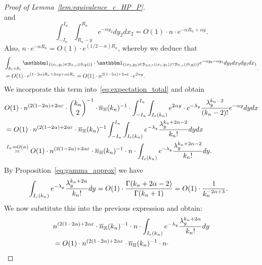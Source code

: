 \begin{proof}[Proof of Lemma~\ref{lem:equivalence_c_HP_P}]
$$$$
and 
$$\int_{-I_n}^{I_n} \int_{R_n - y}^{R_n}  e^{-\alpha y_2} dy_2 dx_2 
=O(1) \cdot n \cdot e^{-\alpha R_n +\alpha y}.
$$
Also, $n \cdot e^{-\alpha R_n} = O(1) \cdot e^{(1/2 -\alpha) R_n}$, whereby we deduce that 
\begin{equation*}
\begin{split}
&\int_{\mathcal{S}_1 \times \mathcal{S}_1} \ind{(x_1,y_1) \in \BallHyp{(0,y)}} \cdot
\ind{(x_2,y_2) \in \BallSym{(x_1,y_1)} \cap \BallHyp{(0,y)}} 
 e^{-\alpha y_2 - \alpha y_1} dy_2 dx_2 dy_1 dx_1 \\
&=O(1) \cdot e^{(1-2\alpha)R_n + 2\alpha y + \alpha \eps R_n} =O(1) \cdot n^{2(1-2\alpha) + 2\alpha \eps} \cdot e^{2\alpha y}.
\end{split}.
\end{equation*}
We incorporate this term into~\eqref{eq:expectation_total} and obtain
\begin{equation*} 
\begin{split}
& O(1) \cdot n^{(2(1-2\alpha) + 2\alpha \varepsilon} \cdot {k_n \choose 2}^{-1} \cdot \overline{n}_{\mathbb{H}}(k_n)^{-1} \cdot 
\int_{-I_n}^{I_n} \int_{I_\varepsilon (k_n)} 
e^{2\alpha y} \cdot e^{-\lambda_y} 
\frac{\lambda_y^{k_n-2}}{(k_n-2)!} e^{-\alpha y} dy dx \\ 
&=O(1) \cdot n^{(2(1-2\alpha) + 2\alpha \varepsilon} \cdot \overline{n}_{\mathbb{H}}(k_n)^{-1}
\int_{-I_n}^{I_n} \int_{I_\varepsilon (k_n)} 
e^{-\lambda_y} 
\frac{\lambda_y^{k_n + 2\alpha - 2}}{k_n!}  dy dx \\ 
&\stackrel{I_n = O(n)}{=}  O(1) \cdot n^{(2(1-2\alpha) + 2\alpha \varepsilon} \cdot \overline{n}_{\mathbb{H}}(k_n)^{-1} \cdot  n \cdot 
\int_{I_\varepsilon (k_n)} e^{-\lambda_y} 
\frac{\lambda_y^{k_n +2\alpha -2}}{k_n!} dy. 
\end{split}
\end{equation*}
By Proposition~\ref{eq:gamma_approx} we have
\begin{equation*} 
\begin{split} 
&\int_{I_\varepsilon (k_n)} e^{-\lambda_y} \frac{\lambda_y^{k_n+2\alpha}}{k_n!}  dy= 
O(1) \cdot \frac{\Gamma(k_n+2\alpha-2)}{\Gamma (k_n+1)} = O(1) \cdot 
\frac{1}{k_n^{-2\alpha +3}}.
\end{split}
\end{equation*}
We now substitute this into the previous expression and obtain: 
\begin{equation*}
\begin{split}
& n^{(2(1-2\alpha) + 2\alpha \eps} \cdot \expH^{-1} \cdot  n \cdot 
\int_{I_\eps (k_n)} e^{-\lambda_y} 
\frac{\lambda_y^{k_n +2\alpha}}{k_n!} dy \\
&= O(1) \cdot n^{(2(1-2\alpha) + 2\alpha \eps} \cdot \expH^{-1} \cdot  n \cdot 

\end{split}
\end{equation*}
\end{proof}
